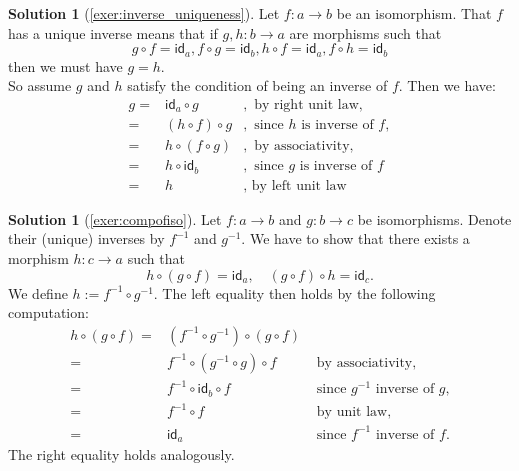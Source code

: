 \documentclass[a4paper,11pt, oneside,titlepage=false]{scrbook}
\theoremstyle{plain}
\theoremstyle{definition}
\newtheorem{solution}[thm]{Solution}
\newcommand{\cfont}[1]{\ensuremath{\mathsf{#1}}}
\newcommand{\Id}[1][]{\cfont{id}_{#1}}
\newcommand{\co}[2]{\ensuremath{#2 \circ #1}}
\begin{document}
\begin{solution}[\cref{exer:inverse_uniqueness}]\label{sol:inverse_uniqueness}
Let $f:a\to b$ be an isomorphism. That $f$ has a unique inverse means that if $g,h : b\to a$ are morphisms such that
\[
\co{f}{g} = \Id[a], \co{g}{f} = \Id[b], \co{f}{h} = \Id[a], \co{h}{f} = \Id[b]
\]
then we must have $g = h$.\\
So assume $g$ and $h$ satisfy the condition of being an inverse of $f$. Then we have:
\begin{eqnarray*}
g =& \co{g}{\Id[a]} &,\text{ by right unit law},\\
	=& \co{g}{(\co{f}{h})} &, \text{ since $h$ is inverse of $f$},\\
	=& \co{(\co{g}{f})}{h} &, \text{ by associativity},\\
	=& \co{\Id[b]}{h} &, \text{ since $g$ is inverse of $f$}\\
	=& h &, \text{ by left unit law}
\end{eqnarray*}
\end{solution}

\begin{solution}[\cref{exer:compofiso}]\label{sol:compofiso}
Let $f: a\to b$ and $g:b\to c$ be isomorphisms. Denote their (unique) inverses by $f^{-1}$ and $g^{-1}$. We have to show that there exists a morphism $h : c\to a$ such that
\[
\co{(\co{f}{g})}{h} = \Id[a], \quad \co{h}{(\co{f}{g})} = \Id[c].
\]
We define $h := \co{g^{-1}}{f^{-1}}$. The left equality then holds by the following computation:
\begin{eqnarray*}
\co{(\co{f}{g})}{h} =& \co{(\co{f}{g})}{(\co{g^{-1}}{f^{-1}})} &\\
	=& \co{f}{\co{(\co{g}{g^{-1}})}{f^{-1}}} &\text{ by associativity,}\\
	=& \co{f}{\co{\Id[b]}{f^{-1}}} &\text{ since $g^{-1}$ inverse of $g$,}\\
	=& \co{f}{f^{-1}} &\text{ by unit law,}\\
	=& \Id[a] &\text{ since $f^{-1}$ inverse of $f$.}
\end{eqnarray*}
The right equality holds analogously.
\end{solution}
\end{document}

